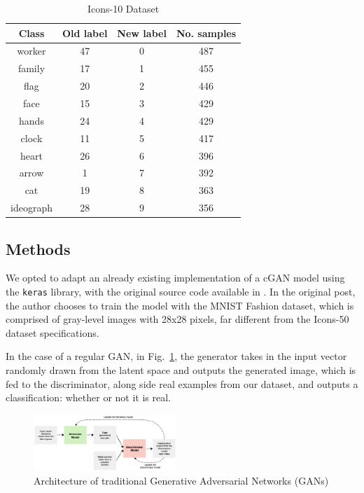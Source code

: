 \documentclass[conference]{IEEEtran}
\begin{document}
\begin{table}[htbp]
    \centering
    \caption{Icons-10 Dataset}
    \begin{tabular}{cccc}
    \hline
    \textbf{Class} & \textbf{Old label} & \textbf{New label} & \textbf{No. samples} \\ \hline
    worker & 47 & 0 & 487  \\ 
    family & 17 & 1 & 455  \\
    flag & 20 & 2 & 446  \\
    face & 15 & 3 & 429  \\
    hands & 24 & 4 & 429  \\
    clock & 11 & 5 & 417  \\
    heart & 26 & 6 & 396  \\
    arrow & 1 & 7 & 392  \\
    cat & 19 & 8 & 363  \\
    ideograph & 28 & 9 & 356 \\ \hline
    \end{tabular}
    \label{tab:Icons10Desc}
\end{table}

\subsection{Methods}
We opted to adapt an already existing implementation of a cGAN model using the \texttt{keras} library, with the original source code available in \cite{BrownleeCGAN, BrownleeGAN}. In the original post, the author chooses to train the model with the MNIST Fashion dataset, which is comprised of gray-level images with 28x28 pixels, far different from the Icons-50 dataset specifications.

In the case of a regular GAN, in Fig.~\ref{fig:GANArch}, the generator takes in the input vector randomly drawn from the latent space and outputs the generated image, which is fed to the discriminator, along side real examples from our dataset, and outputs a classification: whether or not it is real.

\begin{figure}[htbp]
    \centering
    \includegraphics[width=0.48\textwidth]{paper/images/architecture/gan_arch.png}
    \caption{Architecture of traditional Generative Adversarial Networks (GANs)}
    \label{fig:GANArch}
\end{figure}
\end{document}
